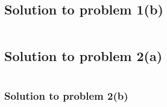 \documentclass[12pt,answers,addpoints]{exam}
\begin{document}
\subsection{Solution to problem 1(b)}
\scriptsize
\inputminted{python}{./sol1_b.py}

\subsection{Solution to problem 2(a)}
\scriptsize
\inputminted{python}{./sol2_a.py}

\subsubsection{Solution to problem 2(b)}
\scriptsize
\inputminted{python}{./sol2_b.py}
\end{document}
